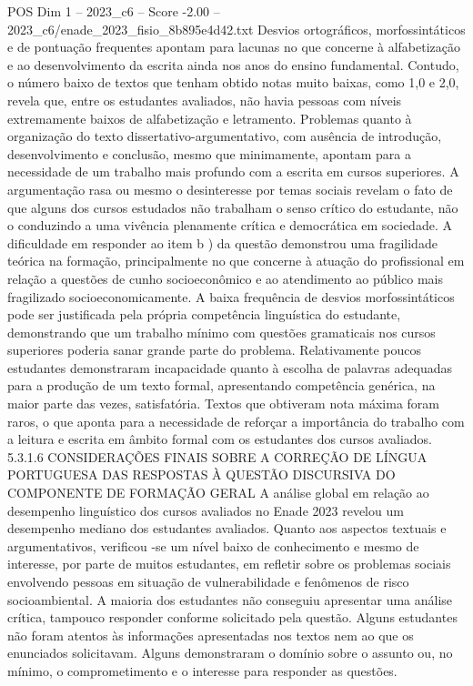 \begin{textsample}{POS Dim 1 – 2023\_c6 – Score -2.00 – 2023\_c6/enade\_2023\_fisio\_8b895e4d42.txt}
Desvios ortográficos, morfossintáticos e de pontuação frequentes apontam para lacunas no que concerne à alfabetização e ao desenvolvimento da escrita ainda nos anos do ensino fundamental.
Contudo, o número baixo de textos que tenham obtido notas muito baixas, como 1,0 e 2,0, revela que, entre os estudantes avaliados, não havia pessoas com níveis extremamente baixos de alfabetização e letramento.
Problemas quanto à organização do texto dissertativo-argumentativo, com ausência de introdução, desenvolvimento e conclusão, mesmo que minimamente, apontam para a necessidade de um trabalho mais profundo com a escrita em cursos superiores.
A argumentação rasa ou mesmo o desinteresse por temas sociais revelam o fato de que alguns dos cursos estudados não trabalham o senso crítico do estudante, não o conduzindo a uma vivência plenamente crítica e democrática em sociedade.
A dificuldade em responder ao item b ) da questão demonstrou uma fragilidade teórica na formação, principalmente no que concerne à atuação do profissional em relação a questões de cunho socioeconômico e ao atendimento ao público mais fragilizado socioeconomicamente.
A baixa frequência de desvios morfossintáticos pode ser justificada pela própria competência linguística do estudante, demonstrando que um trabalho mínimo com questões gramaticais nos cursos superiores poderia sanar grande parte do problema.
Relativamente poucos estudantes demonstraram incapacidade quanto à escolha de palavras adequadas para a produção de um texto formal, apresentando competência genérica, na maior parte das vezes, satisfatória.
Textos que obtiveram nota máxima foram raros, o que aponta para a necessidade de reforçar a importância do trabalho com a leitura e escrita em âmbito formal com os estudantes dos cursos avaliados. 5.3.1.6 CONSIDERAÇÕES FINAIS SOBRE A CORREÇÃO DE LÍNGUA PORTUGUESA DAS RESPOSTAS À QUESTÃO DISCURSIVA DO COMPONENTE DE FORMAÇÃO GERAL A análise global em relação ao desempenho linguístico dos cursos avaliados no Enade 2023 revelou um desempenho mediano dos estudantes avaliados.
Quanto aos aspectos textuais e argumentativos, verificou -se um nível baixo de conhecimento e mesmo de interesse, por parte de muitos estudantes, em refletir sobre os problemas sociais envolvendo pessoas em situação de vulnerabilidade e fenômenos de risco socioambiental.
A maioria dos estudantes não conseguiu apresentar uma análise crítica, tampouco responder conforme solicitado pela questão.
Alguns estudantes não foram atentos às informações apresentadas nos textos nem ao que os enunciados solicitavam.
Alguns demonstraram o domínio sobre o assunto ou, no mínimo, o comprometimento e o interesse para responder as questões.

\end{textsample}

